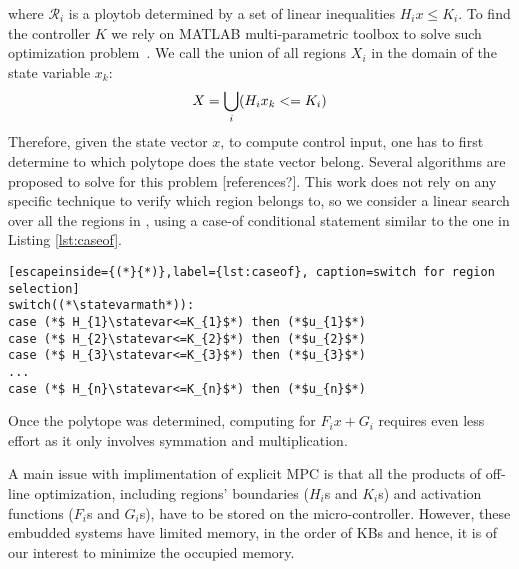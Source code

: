 where $\mathcal{R}_i$ is a ploytob determined by  a set of linear inequalities $H_ix\leq K_i$. To find the controller $K$ we rely on MATLAB multi-parametric toolbox to solve such optimization problem~\cite{matlabMPT, matlabYALMIP}. We call \statespace\space the union of all regions $X_{i}$ in the domain of the state variable $x_{k}$:
\begin{equation}
X = \bigcup_{i}(H_{i}x_{k}<=K_{i})
\end{equation}
Therefore, given the state vector $x$, to compute control input, one has to first determine to which polytope does the state vector belong. Several algorithms are proposed to solve for this problem [references?]. This work does not rely on any specific technique to verify which region \statevarmath belongs to, so we consider a linear search over all the regions in \statespace\space, using a case-of conditional statement similar to the one in Listing \ref{lst:caseof}.

\begin{lstlisting}[escapeinside={(*}{*)},label={lst:caseof}, caption=switch for region selection]
switch((*\statevarmath*)):
case (*$ H_{1}\statevar<=K_{1}$*) then (*$u_{1}$*)
case (*$ H_{2}\statevar<=K_{2}$*) then (*$u_{2}$*)
case (*$ H_{3}\statevar<=K_{3}$*) then (*$u_{3}$*)
...
case (*$ H_{n}\statevar<=K_{n}$*) then (*$u_{n}$*)
\end{lstlisting}
Once the polytope was determined, computing for $F_ix+G_i$ requires even less effort as it only involves symmation and multiplication.  

A main issue with implimentation of explicit MPC is that all the products of off-line optimization, including regions' boundaries ($H_i$s and $K_i$s) and activation functions ($F_i$s and $G_i$s), have to be stored on the micro-controller. However, these embudded systems have limited memory, in the order of KBs and hence, it is of our interest to minimize the occupied memory.